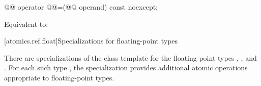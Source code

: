%
%
%
%
%
\begin{itemdecl}
@@ operator @@=(@@ operand) const noexcept;
\end{itemdecl}

\begin{itemdescr}
\pnum
\effects Equivalent to:
\end{itemdescr}

[atomics.ref.float]{Specializations for floating-point types}

\pnum
{}%
There are specializations of the  class template
for the floating-point types
,
, and
.
For each such type ,
the specialization  provides
additional atomic operations appropriate to floating-point types.

